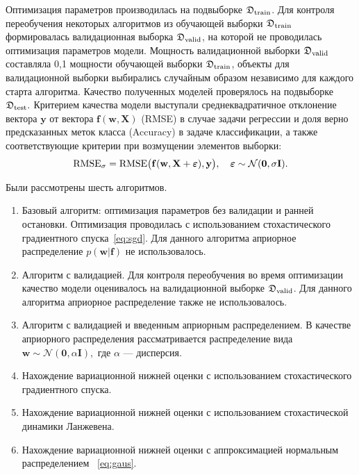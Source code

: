 Оптимизация параметров производилась на подвыборке $\mathfrak{D}_\textnormal{train}$. Для контроля переобучения некоторых алгоритмов из обучающей выборки $\mathfrak{D}_\textnormal{train}$ формировалась валидационная выборка $\mathfrak{D}_\textnormal{valid}$, на которой не проводилась оптимизация параметров  модели. Мощность валидационной выборки $\mathfrak{D}_\textnormal{valid}$ составляла 0,1 мощности обучающей выборки  $\mathfrak{D}_\textnormal{train}$, объекты для валидационной выборки выбирались случайным образом независимо для каждого старта алгоритма.
Качество полученных моделей проверялось на подвыборке $\mathfrak{D}_\textnormal{test}.$ Критерием качества модели выступали среднеквадратичное отклонение вектора $\mathbf{y}$ от вектора $\mathbf{f}(\mathbf{w}, \mathbf{X})$ (RMSE) {в случае задачи регрессии и доля верно предсказанных меток класса (Accuracy) в задаче классификации}, а также { соответствующие критерии } при возмущении элементов выборки:
\begin{equation}
\label{eq:rmse}
	\textnormal{RMSE}_{\sigma} =\textnormal{RMSE}\bigl(\mathbf{f}( \mathbf{w}, \mathbf{X}+\boldsymbol{\varepsilon}), \mathbf{y}\bigr),  \quad \boldsymbol{\varepsilon} \sim \mathcal{N}(\mathbf{0}, \sigma \mathbf{I}).
\end{equation}

Были рассмотрены шесть алгоритмов.
\begin{enumerate}%
\item Базовый алгоритм: оптимизация параметров без валидации и ранней остановки. Оптимизация проводилась с использованием стохастического градиентного спуска~\eqref{eq:sgd}. Для данного алгоритма априорное распределение $p(\mathbf{w}|\mathbf{f})$ не использовалось.
\item Алгоритм с валидацией. Для контроля переобучения во время оптимизации качество модели оценивалось на валидационной выборке $\mathfrak{D}_\textnormal{valid}$. Для данного алгоритма априорное распределение также не использовалось.
\item Алгоритм с валидацией и введенным априорным распределением. В качестве априорного распределения рассматривается распределение вида
$
	\mathbf{w} \sim \mathcal{N}(\mathbf{0}, \alpha \mathbf{I}), 
$
где $\alpha$ --- дисперсия.

\item Нахождение вариационной нижней оценки с использованием стохастического градиентного спуска.
\item Нахождение вариационной нижней оценки с использованием стохастической динамики Ланжевена.
\item Нахождение вариационной нижней оценки с аппроксимацией нормальным распределением ~\eqref{eq:gaus}.
\end{enumerate}




